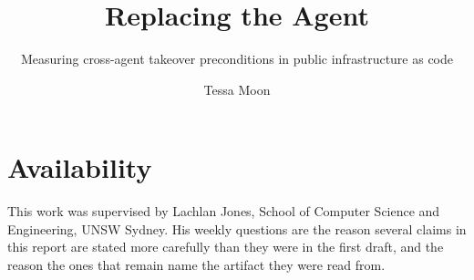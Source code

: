 \documentclass[sigconf,nonacm,screen]{acmart}
\begin{document}
\title{Replacing the Agent}
\subtitle{Measuring cross-agent takeover preconditions in public infrastructure as code}

\author{Tessa Moon}

\begin{abstract}

\end{abstract}


\maketitle


















\section{Availability}
\label{sec:availability}


\begin{acks}
This work was supervised by Lachlan Jones, School of Computer Science and
Engineering, UNSW Sydney. His weekly questions are the reason several claims in
this report are stated more carefully than they were in the first draft, and the reason the
ones that remain name the artifact they were read from.
\end{acks}




\appendix


\end{document}
